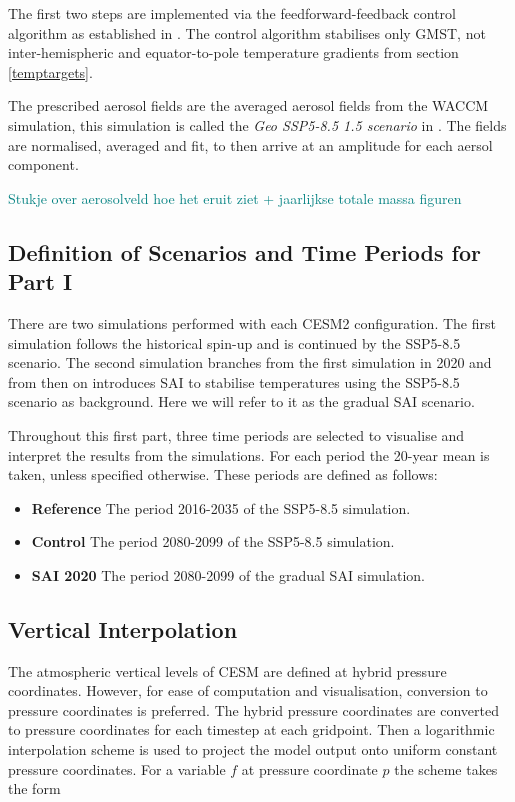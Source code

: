 The first two steps are implemented via the feedforward-feedback control algorithm as established in \textcite{kravitz2017}. The control algorithm stabilises only GMST, not inter-hemispheric and equator-to-pole temperature gradients from section \ref{temptargets}.

The prescribed aerosol fields are the averaged aerosol fields from the WACCM simulation, this simulation is called the \textit{Geo SSP5-8.5 1.5 scenario} in \textcite{tilmes2020}. The fields are normalised, averaged and fit, to then arrive at an amplitude for each aersol component.

\textcolor{teal}{Stukje over aerosolveld hoe het eruit ziet + jaarlijkse totale massa figuren}


\subsection{Definition of Scenarios and Time Periods for Part I}
There are two simulations performed with each CESM2 configuration. The first simulation follows the historical spin-up and is continued by the SSP5-8.5 scenario. The second simulation branches from the first simulation in 2020 and from then on introduces SAI to stabilise temperatures using the SSP5-8.5 scenario as background. Here we will refer to it as the gradual SAI scenario. 

Throughout this first part, three time periods are selected to visualise and interpret the results from the simulations. For each period the 20-year mean is taken, unless specified otherwise. These periods are defined as follows:

\begin{itemize}
    \item \textbf{Reference} The period 2016-2035 of the SSP5-8.5 simulation.
    \item \textbf{Control} The period 2080-2099 of the SSP5-8.5 simulation.
    \item \textbf{SAI 2020} The period 2080-2099 of the gradual SAI simulation.
\end{itemize} %


\subsection{Vertical Interpolation}
The atmospheric vertical levels of CESM are defined at hybrid pressure coordinates. However, for ease of computation and visualisation, conversion to pressure coordinates is preferred. The hybrid pressure coordinates are converted to pressure coordinates for each timestep at each gridpoint. Then a logarithmic interpolation scheme is used to project the model output onto uniform constant pressure coordinates. For a variable $f$ at pressure coordinate $p$ the scheme takes the form

